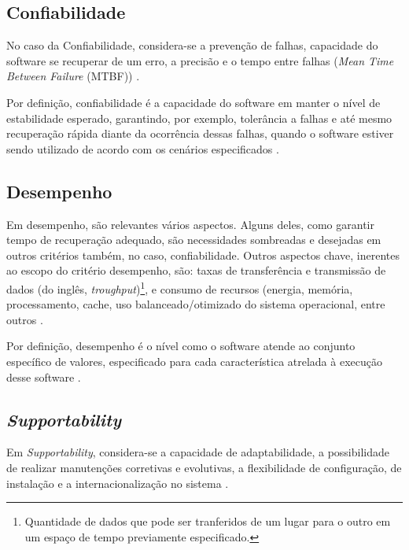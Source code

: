 \subsection{Confiabilidade}
\label{subsec:confiabilidade}

No caso da Confiabilidade, considera-se a prevenção de falhas, capacidade do software se recuperar de um erro, a precisão e o tempo entre falhas (\textit{Mean Time Between Failure} (MTBF)) \cite{cintra2006implementaccao}.

Por definição, confiabilidade é a capacidade do software em manter o nível de estabilidade esperado, garantindo, por exemplo, tolerância a falhas e até mesmo recuperação rápida diante da ocorrência dessas falhas, quando o software estiver sendo utilizado de acordo com os cenários especificados \cite{qualidadeDeProdutoNBR}.  

\subsection{Desempenho}
\label{subsec:desempenho}

Em desempenho, são relevantes vários aspectos. Alguns deles, como garantir tempo de recuperação adequado, são necessidades sombreadas e desejadas em outros critérios também, no caso, confiabilidade. Outros aspectos chave, inerentes ao escopo do critério desempenho, são: taxas de transferência e transmissão de dados (do inglês, \textit{troughput})\footnote[1]{Quantidade de dados que pode ser tranferidos de um lugar para o outro em um espaço de tempo previamente especificado.}, e consumo de recursos (energia, memória, processamento, cache, uso balanceado/otimizado do sistema operacional, entre outros \cite{cintra2006implementaccao}.

Por definição, desempenho é o nível como o software atende ao conjunto específico de valores, especificado para cada característica atrelada à execução desse software \cite{qualidadeDeProdutoNBR}.  

\subsection{\textit{Supportability}}
\label{subsec:suportabilidade}

Em \textit{Supportability}, considera-se a capacidade de adaptabilidade, a possibilidade de realizar manutenções corretivas e evolutivas, a flexibilidade de configuração, de instalação e a internacionalização no sistema \cite{cintra2006implementaccao}.

